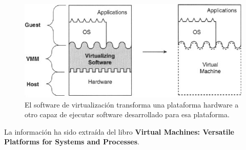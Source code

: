 \documentclass[11pt,a4paper]{article}
\begin{document}
 \begin{figure}[H]
	\centering
	\includegraphics[scale=0.75]{images/fig17.jpg}
	\caption[Sistema  de maquina virtual]{El software de virtualización transforma una plataforma hardware a otro capaz de ejecutar software desarrollado para esa plataforma.}
	\label{fig:1.7}
\end{figure}
La información ha sido extraída del libro \textbf{Virtual Machines: Versatile Platforms for Systems and Processes}\cite{smith2005virtual}.
\end{document}
